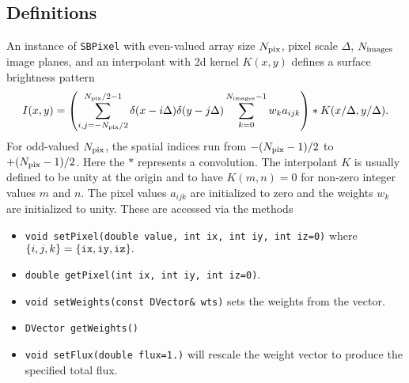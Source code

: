 \documentclass[11pt,preprint,flushrt]{aastex}
\begin{document}
\subsection{Definitions}
An instance of {\tt SBPixel} with even-valued array size $N_{\rm pix}$, pixel scale $\Delta$, $N_{\rm images}$ image planes, and an interpolant with 2d kernel $K(x,y)$ defines a surface brightness pattern
\begin{equation}
\label{sbpix1}
I(x,y) = \left( \sum_{i,j=-N_{\rm pix}/2}^{N_{\rm pix}/2-1} \delta(x-i\Delta)\delta(y-j\Delta)
\sum_{k=0}^{N_{\rm images}-1} w_ka_{ijk} \right) \ast K( x/\Delta, y/\Delta).
\end{equation}
For odd-valued $N_{\rm pix}$, the spatial indices run from $-(N_{\rm pix}-1)/2$ to $+(N_{\rm pix}-1)/2$.
Here the $\ast$ represents a convolution.  The interpolant $K$ is usually defined to be unity at the origin and to have $K(m,n)=0$ for non-zero integer values $m$ and $n$.  The pixel values $a_{ijk}$ are initialized to zero and the weights $w_k$ are initialized to unity.  These are accessed via the methods
\begin{itemize}
\item {\tt void setPixel(double value, int ix, int iy, int iz=0)} where $\{i,j,k\}=\{ {\tt ix,iy,iz} \}.$
\item {\tt double getPixel(int ix, int iy, int iz=0)}. 
\item {\tt void setWeights(const DVector\& wts)} sets the weights from the vector.
\item {\tt DVector getWeights()}
\item {\tt void setFlux(double flux=1.)} will rescale the weight vector to produce the specified total flux.
\end{itemize}
\end{document}
